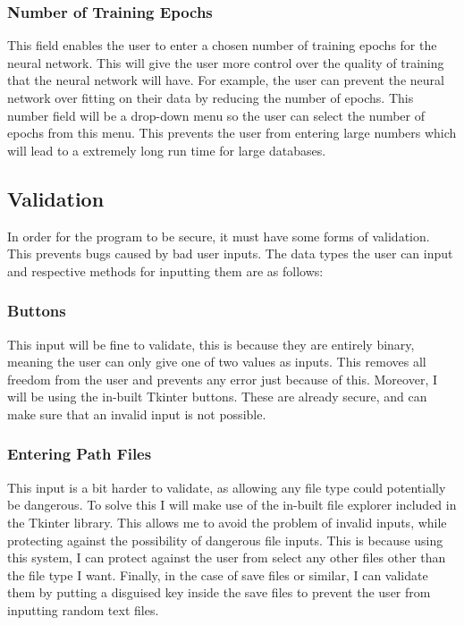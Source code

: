 \documentclass{report}
\begin{document}
\subsubsection{Number of Training Epochs}
This field enables the user to enter a chosen number of training epochs for the neural network. This will give the user more control over the quality of training that the neural network will have. For example, the user can prevent the neural network over fitting on their data by reducing the number of epochs. This number field will be a drop-down menu so the user can select the number of epochs from this menu. This prevents the user from entering large numbers which will lead to a extremely long run time for large databases.
\newpage

\subsection{Validation}
In order for the program to be secure, it must have some forms of validation. This prevents bugs caused by bad user inputs. The data types the user can input and respective methods for inputting them are as follows:

\subsubsection{Buttons}
This input will be fine to validate, this is because they are entirely binary, meaning the user can only give one of two values as inputs. This removes all freedom from the user and prevents any error just because of this. Moreover, I will be using the in-built Tkinter buttons. These are already secure, and can make sure that an invalid input is not possible.

\subsubsection{Entering Path Files}
This input is a bit harder to validate, as allowing any file type could potentially be dangerous. To solve this I will make use of the in-built file explorer included in the Tkinter library. This allows me to avoid the problem of invalid inputs, while protecting against the possibility of dangerous file inputs. This is because using this system, I can protect against the user from select any other files other than the file type I want. Finally, in the case of save files or similar, I can validate them by putting a disguised key inside the save files to prevent the user from inputting random text files.
\end{document}
